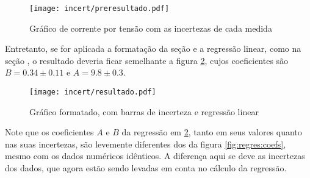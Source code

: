     \begin{figure}[htbp]
        \centering
        \texttt{[image: incert/preresultado.pdf]}

        \caption{Gráfico de corrente por tensão com as incertezas de cada medida}
        \label{fig:incert:preresultado}
    \end{figure}

    Entretanto, se for aplicada a formatação da seção  e a regressão linear, como na seção , o resultado deveria ficar semelhante a figura \ref{fig:incert:resultado}, cujos coeficientes são $B = 0.34 \pm 0.11$ e $A = 9.8 \pm 0.3$.

    \begin{figure}[htbp]
        \centering
        \texttt{[image: incert/resultado.pdf]}

        \caption{Gráfico formatado, com barras de incerteza e regressão linear}
        \label{fig:incert:resultado}
    \end{figure}

    \begin{nota}
        Note que os coeficientes $A$ e $B$ da regressão em \ref{fig:incert:resultado}, tanto em seus valores quanto nas suas incertezas, são levemente diferentes dos da figura \ref{fig:regres:coefs}, mesmo com os dados numéricos idênticos. A diferença aqui se deve as incertezas dos dados, que agora estão sendo levadas em conta no cálculo da regressão.
    \end{nota}
